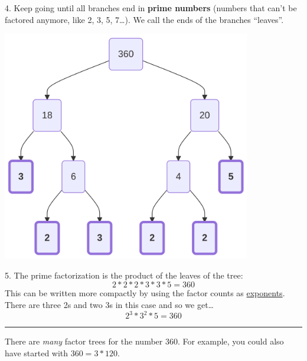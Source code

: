 \documentclass[
  letterpaper,
  DIV=11,
  numbers=noendperiod]{scrreprt}
\begin{document}
4. Keep going until all branches end in \textbf{prime numbers} (numbers
that can't be factored anymore, like 2, 3, 5, 7\ldots). We call the ends
of the branches ``leaves''.

\label{mermaid-diagram}
\includegraphics[width=4.28in,height=3.98in]{chapters/Unit_1/1.2_Factors_Multiples_&_Prime_Factorization_files/figure-latex/mermaid-figure-7.png}

5. The prime factorization is the product of the leaves of the tree:
\[2 * 2 * 2 * 3 * 3 * 5 = 360\] This can be written more compactly by
using the factor counts as
\href{./glossary.html\#glossary-exponent}{exponents}. There are three 2s
and two 3s in this case and so we get\ldots{} \[2^3 * 3^2 * 5 = 360\]

\begin{center}\rule{0.5\linewidth}{0.5pt}\end{center}

There are \emph{many} factor trees for the number 360. For example, you
could also have started with \(360 = 3 * 120\).
\end{document}
